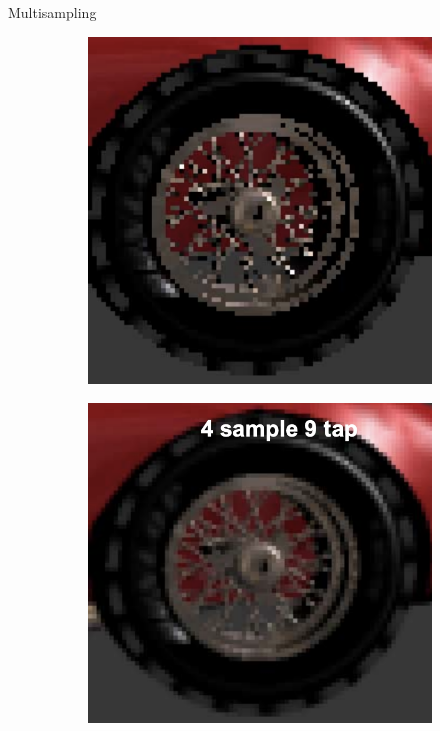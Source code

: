 \documentclass[table]{beamer}
\begin{document}
\begin{frame}[fragile]{Multisampling}
    \begin{figure}[!htbp]
        \centering
        \begin{subfigure}[b]{0.45\textwidth}
            \includegraphics[width=\textwidth]{figures/msaaoff.png}
        \end{subfigure}
        \centering
        \begin{subfigure}[b]{0.45\textwidth}
            \includegraphics[width=\textwidth]{figures/msaa.png}
        \end{subfigure}
    \end{figure}
\end{frame}
\end{document}
